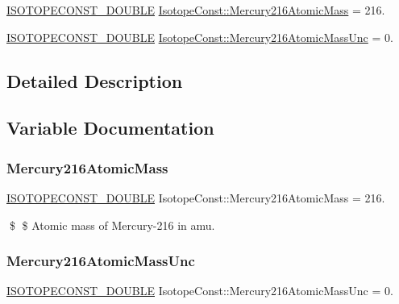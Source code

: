\begin{DoxyCompactItemize}
\item 
\mbox{\hyperlink{group___isotope_const-_macros_ga8f45a7272ce02c0b4c65c44636ed719a}{I\+S\+O\+T\+O\+P\+E\+C\+O\+N\+S\+T\+\_\+\+D\+O\+U\+B\+LE}} \mbox{\hyperlink{group___isotope_const-_mercury-_hg216_gace1092e4c5e355b4a7890d461c4ecf83}{Isotope\+Const\+::\+Mercury216\+Atomic\+Mass}} = 216.
\item 
\mbox{\hyperlink{group___isotope_const-_macros_ga8f45a7272ce02c0b4c65c44636ed719a}{I\+S\+O\+T\+O\+P\+E\+C\+O\+N\+S\+T\+\_\+\+D\+O\+U\+B\+LE}} \mbox{\hyperlink{group___isotope_const-_mercury-_hg216_gadd271cd9b0494d3a2b30df02571e1179}{Isotope\+Const\+::\+Mercury216\+Atomic\+Mass\+Unc}} = 0.
\end{DoxyCompactItemize}


\subsection{Detailed Description}


\subsection{Variable Documentation}
\mbox{\label{group___isotope_const-_mercury-_hg216_gace1092e4c5e355b4a7890d461c4ecf83}} 
\subsubsection{\texorpdfstring{Mercury216\+Atomic\+Mass}{Mercury216AtomicMass}}
{\footnotesize\ttfamily \mbox{\hyperlink{group___isotope_const-_macros_ga8f45a7272ce02c0b4c65c44636ed719a}{I\+S\+O\+T\+O\+P\+E\+C\+O\+N\+S\+T\+\_\+\+D\+O\+U\+B\+LE}} Isotope\+Const\+::\+Mercury216\+Atomic\+Mass = 216.}

\$ \$ Atomic mass of Mercury-\/216 in amu. \mbox{\label{group___isotope_const-_mercury-_hg216_gadd271cd9b0494d3a2b30df02571e1179}} 
\subsubsection{\texorpdfstring{Mercury216\+Atomic\+Mass\+Unc}{Mercury216AtomicMassUnc}}
{\footnotesize\ttfamily \mbox{\hyperlink{group___isotope_const-_macros_ga8f45a7272ce02c0b4c65c44636ed719a}{I\+S\+O\+T\+O\+P\+E\+C\+O\+N\+S\+T\+\_\+\+D\+O\+U\+B\+LE}} Isotope\+Const\+::\+Mercury216\+Atomic\+Mass\+Unc = 0.}

